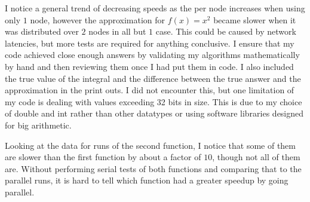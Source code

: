 \documentclass[11pt]{article}
\begin{document}
I notice a general trend of decreasing speeds as the per node increases when using only $1$ node, however the approximation for $f(x)=x^2$ became slower when it was distributed over $2$ nodes in all but $1$ case. This could be caused by network latencies, but more tests are required for anything conclusive. I ensure that my code achieved close enough answers by validating my algorithms mathematically by hand and then reviewing them once I had put them in code. I also included the true value of the integral and the difference between the true answer and the approximation in the print outs. I did not encounter this, but one limitation of my code is dealing with values exceeding 32 bits in size. This is due to my choice of double and int rather than other datatypes or using software libraries designed for big arithmetic.

Looking at the data for runs of the second function, I notice that some of them are slower than the first function by about a factor of $10$, though not all of them are.  Without performing serial tests of both functions and comparing that to the parallel runs, it is hard to tell which function had a greater speedup by going parallel.
\end{document}
